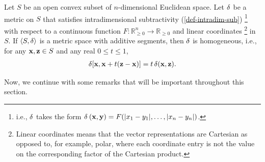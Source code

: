 \begin{thm} \label{thm-homogeneity}
	Let $S$ be an open convex subset of $n$-dimensional Euclidean space. Let $\operatorname{\delta}$ be a metric on $S$ that satisfies intradimensional subtractivity (\cref{def-intradim-sub}) \footnote{i.e., $\operatorname{\delta}$ takes the form $\operatorname{\delta}_{} \left( \mathbf{x}, \mathbf{y} \right) = F(|x_1 - y_1|, \dots, |x_n - y_n|)$.} with respect to a continuous function $F: \mathbb{R}_{\geq 0}^n \rightarrow \mathbb{R}_{\geq 0}$ and linear coordinates \footnote{Linear coordinates means that the vector representations are Cartesian as opposed to, for example, polar, where each coordinate entry is not the value on the corresponding factor of the Cartesian product.} in $S$. If $\langle S, \operatorname{\delta} \rangle$ is a metric space with additive segments, then $\operatorname{\delta}$ is homogeneous, i.e., for any $\mathbf{x}, \mathbf{z} \in S$ and any real $0 \leq t \leq 1$,
	\begin{align*}
		\operatorname{\delta}[\mathbf{x}, \mathbf{x} + t(\mathbf{z} - \mathbf{x})] = t\operatorname{\delta}(\mathbf{x}, \mathbf{z}).
	\end{align*}
\end{thm}
Now, we continue with some remarks that will be important throughout this section.

